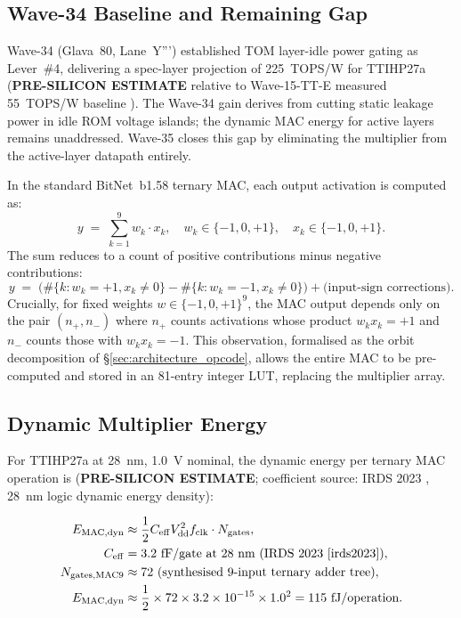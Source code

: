 \subsection{Wave-34 Baseline and Remaining Gap}

Wave-34 (Glava~80, Lane~Y''') established TOM layer-idle power gating as
Lever~\#4, delivering a spec-layer projection of 225~TOPS/W for TTIHP27a
(\textbf{PRE-SILICON ESTIMATE} relative to Wave-15-TT-E measured 55~TOPS/W
baseline \cite{bitnet_b158_2024}).  The Wave-34 gain derives from cutting
static leakage power in idle ROM voltage islands; the dynamic MAC energy
for active layers remains unaddressed.  Wave-35 closes this gap by
eliminating the multiplier from the active-layer datapath entirely.

In the standard BitNet~b1.58 \cite{bitnet_b158_2024} ternary MAC, each output
activation is computed as:
\[
  y \;=\; \sum_{k=1}^{9} w_k \cdot x_k,
  \quad w_k \in \{-1, 0, +1\}, \quad x_k \in \{-1, 0, +1\}.
\]
The sum reduces to a count of positive contributions minus negative contributions:
\[
  y \;=\; \bigl(\#\{k : w_k = +1, x_k \neq 0\} - \#\{k : w_k = -1, x_k \neq 0\}\bigr)
        + \bigl(\text{input-sign corrections}\bigr).
\]
Crucially, for fixed weights $w \in \{-1,0,+1\}^9$, the MAC output depends only
on the pair $(n_{+}, n_{-})$ where $n_{+}$ counts activations whose product
$w_k x_k = +1$ and $n_{-}$ counts those with $w_k x_k = -1$.  This
observation, formalised as the orbit decomposition of
\S\ref{sec:architecture_opcode}, allows the entire MAC to be pre-computed
and stored in an 81-entry integer LUT, replacing the multiplier array.

\subsection{Dynamic Multiplier Energy}

For TTIHP27a at 28~nm, 1.0~V nominal, the dynamic energy per ternary MAC
operation is (\textbf{PRE-SILICON ESTIMATE}; coefficient source: IRDS 2023
\cite{irds2023}, 28~nm logic dynamic energy density):

\begin{align}
  E_{\mathrm{MAC,dyn}} &\approx \frac{1}{2} C_{\mathrm{eff}} V_{\mathrm{dd}}^2 f_{\mathrm{clk}} \cdot N_{\mathrm{gates}}, \\
  C_{\mathrm{eff}} &= 3.2\text{ fF/gate at 28~nm (IRDS 2023 \cite{irds2023})}, \\
  N_{\mathrm{gates, MAC9}} &\approx 72 \text{ (synthesised 9-input ternary adder tree)}, \\
  E_{\mathrm{MAC,dyn}} &\approx \frac{1}{2} \times 72 \times 3.2 \times 10^{-15} \times 1.0^2
                      = 115\text{ fJ/operation}.
\end{align}

